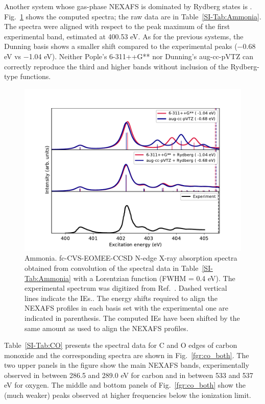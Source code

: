 \documentclass[journal=jctcce,manuscript=article]{achemso}
\begin{document}

Another system whose gas-phase NEXAFS is dominated by Rydberg states is . Fig.~\ref{fgr:ammonia} shows
the computed spectra; the raw data are 
in Table~\ref{SI-Tab:Ammonia}. The spectra were aligned with respect to the peak maximum of the first experimental band, estimated at 400.53 eV. As for the previous systems, the Dunning basis shows a smaller shift compared to the experimental peaks ($-$0.68 eV vs $-$1.04 eV). Neither Pople's 6-311++G** nor Dunning's aug-cc-pVTZ can correctly reproduce the third and higher bands without inclusion of the Rydberg-type functions. 

\begin{figure}[H]
\includegraphics[width=1\textwidth]{Spectra/NH3.pdf}
\caption{Ammonia. fc-CVS-EOMEE-CCSD N-edge X-ray absorption spectra obtained from convolution of the spectral data in Table~\ref{SI-Tab:Ammonia} 
with a Lorentzian function (FWHM = 0.4 eV). The experimental spectrum was digitized from Ref.~. Dashed vertical lines indicate the IEs.\label{fgr:ammonia}.
The energy shifts 
required to align the NEXAFS profiles in each basis set with the
experimental one are indicated in parenthesis. The computed IEs have been shifted by the same amount as used to align the NEXAFS profiles.}
\end{figure}

Table~\ref{SI-Tab:CO} presents the spectral data for C and O edges of carbon monoxide and the corresponding spectra are shown in Fig.~\ref{fgr:co_both}. The two upper panels in the figure show the main NEXAFS bands, experimentally observed 
in between 286.5 and 289.0 eV for carbon and in between 533 and 537 eV for oxygen. The middle and bottom panels of Fig.~\ref{fgr:co_both}
show the (much weaker) peaks observed at higher frequencies below 
the ionization limit.
\end{document}

